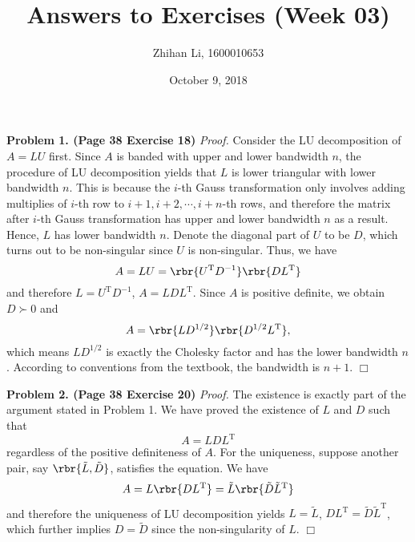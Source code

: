 \documentclass[english, nochinese]{pnote}
\title{Answers to Exercises (Week 03)}
\author{Zhihan Li, 1600010653}
\date{October 9, 2018}
\begin{document}
\maketitle

\textbf{Problem 1. (Page 38 Exercise 18)} \textit{Proof.} Consider the LU decomposition of $ A = L U $ first. Since $A$ is banded with upper and lower bandwidth $n$, the procedure of LU decomposition yields that $L$ is lower triangular with lower bandwidth $n$. This is because the $i$-th Gauss transformation only involves adding multiplies of $i$-th row to $ i + 1, i + 2, \cdots, i + n $-th rows, and therefore the matrix after $i$-th Gauss transformation has upper and lower bandwidth $n$ as a result. Hence, $L$ has lower bandwidth $n$. Denote the diagonal part of $U$ to be $D$, which turns out to be non-singular since $U$ is non-singular. Thus, we have
\begin{equation}
A = L U = \rbr{ U^{\text{T}} D^{-1} } \rbr{ D L^{\text{T}} }
\end{equation}
and therefore $ L = U^{\text{T}} D^{-1} $, $ A = L D L^{\text{T}} $. Since $A$ is positive definite, we obtain $ D \succ 0 $ and
\begin{equation}
A = \rbr{ L D^{ 1 / 2 } } \rbr{ D^{ 1 / 2 } L^{\text{T}} },
\end{equation}
which means $ L D^{ 1 / 2 } $ is exactly the Cholesky factor and has the lower bandwidth $n$. According to conventions from the textbook, the bandwidth is $ n + 1 $.
\hfill$\Box$

\textbf{Problem 2. (Page 38 Exercise 20)} \textit{Proof.} The existence is exactly part of the argument stated in Problem 1. We have proved the existence of $L$ and $D$ such that
\begin{equation}
A = L D L^{\text{T}}
\end{equation}
regardless of the positive definiteness of $A$. For the uniqueness, suppose another pair, say $ \rbr{ \tilde{L}, \tilde{D} } $, satisfies the equation. We have
\begin{equation}
A = L \rbr{ D L^{\text{T}} } = \tilde{L} \rbr{ \tilde{D} \tilde{L}^{\text{T}}}
\end{equation}
and therefore the uniqueness of LU decomposition yields $ L = \tilde{L} $, $ D L^{\text{T}} = \tilde{D} \tilde{L}^{\text{T}} $, which further implies $ D = \tilde{D} $ since the non-singularity of $L$.
\hfill$\Box$
\end{document}
